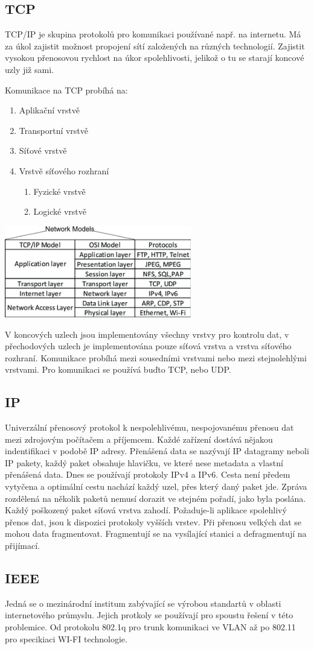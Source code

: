 \subsection{TCP}
TCP/IP je skupina protokolů pro komunikaci používané např. na internetu.
Má za úkol zajistit možnost propojení sítí založených na různých technologií.
Zajistit vysokou přenosovou rychlost na úkor spolehlivosti, jelikož o tu se starají koncové uzly již sami.
\begin{multicols}{2}
  Komunikace na TCP probíhá na: \\
  \begin{enumerate}
    \item Aplikační vrstvě
    \item Transportní vrstvě
    \item Síťové vrstvě
    \item Vrstvě síťového rozhraní
          \begin{enumerate}
            \item Fyzické vrstvě
            \item Logické vrstvě
          \end{enumerate}
  \end{enumerate}
  \columnbreak
  \includegraphics[height=4cm]{TVY-POS/ISO-OSI-TCP-IP/tcpip.jpg}
\end{multicols}
V koncových uzlech jsou implementovány všechny vrstvy pro kontrolu dat, v přechodových uzlech je implementována pouze síťová vrstva a vrstva síťového rozhraní.
Komunikace probíhá mezi sousedními vrstvami nebo mezi stejnolehlými vrstvami.
Pro komunikaci se používá buďto TCP, nebo UDP.
\subsection{IP}
Univerzální přenosový protokol k nespolehlivému, nespojovanému přenosu dat mezi zdrojovým počítačem a příjemcem.
Každé zařízení dostává nějakou indentifikaci v podobě IP adresy.
Přenášená data se nazývají IP datagramy neboli IP pakety, každý paket obsahuje hlavičku, ve které nese metadata a vlastní přenášená data.
Dnes se používají protokoly IPv4 a IPv6.
Cesta není předem vytyčena a optimální cestu nachází každý uzel, přes který daný paket jde.
Zpráva rozdělená na několik paketů nemusí dorazit ve stejném pořadí, jako byla poslána.
Každý poškozený paket síťová vrstva zahodí.
Požaduje-li aplikace spolehlivý přenos dat, jsou k dispozici protokoly vyšších vrstev.
Při přenosu velkých dat se mohou data fragmentovat.
Fragmentují se na vysílající stanici a defragmentují na přijímací.
\subsection{IEEE}
Jedná se o mezinárodní institum zabývající se výrobou standartů v oblasti internetového průmyslu.
Jejich protkoly se používají pro spoustu řešení v této problemice.
Od protokolu 802.1q pro trunk komunikaci ve VLAN až po 802.11 pro specikiaci WI-FI technologie.

